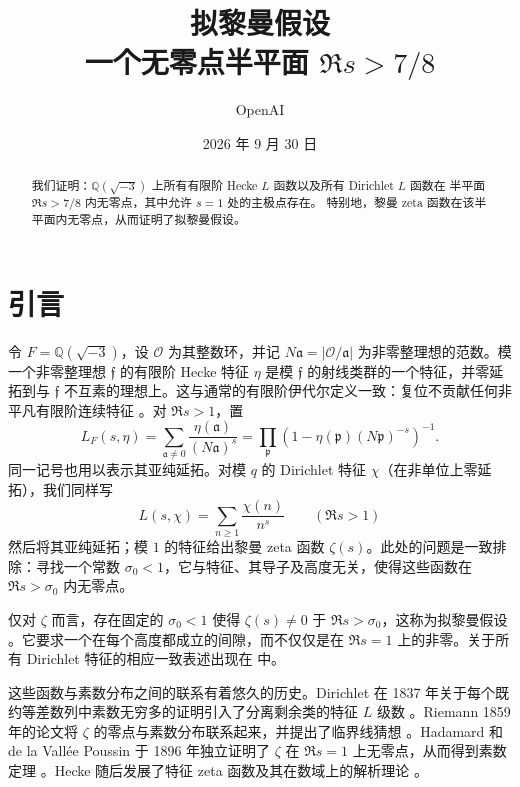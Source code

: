 \documentclass[11pt,a4paper]{article}
\title{拟黎曼假设\\[0.5em]
\large 一个无零点半平面 \texorpdfstring{$\Re s>7/8$}{Re(s)>7/8}}
\author{OpenAI}
\date{2026 年 9 月 30 日}
\numberwithin{equation}{section}
\numberwithin{figure}{section}
\theoremstyle{definition}
\theoremstyle{remark}
\begin{document}
\maketitle

\begin{abstract}
我们证明：$\mathbb Q(\sqrt{-3})$ 上所有有限阶 Hecke $L$ 函数以及所有 Dirichlet $L$ 函数在
半平面 $\Re s>7/8$ 内无零点，其中允许 $s=1$ 处的主极点存在。
特别地，黎曼 zeta 函数在该半平面内无零点，从而证明了拟黎曼假设。
\end{abstract}

\tableofcontents
\clearpage

\section{引言}\label{sec:introduction}

令 $F=\mathbb Q(\sqrt{-3})$，设 $\mathcal O$ 为其整数环，并记 $N\mathfrak a=|\mathcal O/\mathfrak a|$ 为非零整理想的范数。模一个非零整理想 $\mathfrak f$ 的有限阶 Hecke 特征 $\eta$ 是模 $\mathfrak f$ 的射线类群的一个特征，并零延拓到与 $\mathfrak f$ 不互素的理想上。这与通常的有限阶伊代尔定义一致：复位不贡献任何非平凡有限阶连续特征 \cite[第 VI 章，第 1 节]{MilneCFT}。对 $\Re s>1$，置
\[
 L_F(s,\eta)=\sum_{\mathfrak a\ne0}
       \frac{\eta(\mathfrak a)}{(N\mathfrak a)^s}
 =\prod_{\mathfrak p}
       \left(1-\eta(\mathfrak p)(N\mathfrak p)^{-s}\right)^{-1}.
\]
同一记号也用以表示其亚纯延拓。对模 $q$ 的 Dirichlet 特征 $\chi$（在非单位上零延拓），我们同样写
\[
 L(s,\chi)=\sum_{n\ge1}\frac{\chi(n)}{n^s}
 \qquad(\Re s>1)
\]
然后将其亚纯延拓；模 $1$ 的特征给出黎曼 zeta 函数 $\zeta(s)$。此处的问题是一致排除：寻找一个常数 $\sigma_0<1$，它与特征、其导子及高度无关，使得这些函数在 $\Re s>\sigma_0$ 内无零点。

仅对 $\zeta$ 而言，存在固定的 $\sigma_0<1$ 使得 $\zeta(s)\ne0$ 于 $\Re s>\sigma_0$，这称为拟黎曼假设 \cite[第 1 节]{BCSS}。它要求一个在每个高度都成立的间隙，而不仅仅是在 $\Re s=1$ 上的非零。关于所有 Dirichlet 特征的相应一致表述出现在 \cite[第 288 页，方程 (1.4) 及其后一段]{FG} 中。

这些函数与素数分布之间的联系有着悠久的历史。Dirichlet 在 1837 年关于每个既约等差数列中素数无穷多的证明引入了分离剩余类的特征 $L$ 级数 \cite{Dirichlet}。Riemann 1859 年的论文将 $\zeta$ 的零点与素数分布联系起来，并提出了临界线猜想 \cite{Riemann}。Hadamard 和 de la Vall\'ee Poussin 于 1896 年独立证明了 $\zeta$ 在 $\Re s=1$ 上无零点，从而得到素数定理 \cite{Hadamard,ValleePoussin}。Hecke 随后发展了特征 zeta 函数及其在数域上的解析理论 \cite{Hecke}。
\end{document}
